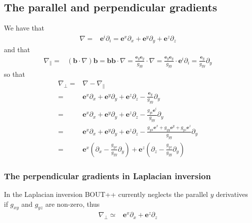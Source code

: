 \documentclass[12pt]{article}
\def\L{\left}
\def\R{\right}
\newcommand{\Grad}{\ensuremath{\nabla}}
\newcommand{\ve}[1]{\ensuremath{\boldsymbol{#1}}}
\begin{document}
\subsection{The parallel and perpendicular gradients}
%
We have that
%
\begin{align*}
    \Grad =& \ve{e}^i \partial_i = \ve{e}^x \partial_x + \ve{e}^y \partial_y +
    \ve{e}^z \partial_z
\end{align*}
%
and that
%
\begin{align*}
    \Grad_\| =& \L(\ve{b} \cdot \Grad\R) \ve{b} = \ve{b} \ve{b} \cdot \Grad =
    \frac{\ve{e}_y \ve{e}_y}{g_{yy}} \cdot \Grad = \frac{\ve{e}_y
    \ve{e}_y}{g_{yy}} \cdot \ve{e}^i \partial_i = \frac{\ve{e}_y}{g_{yy}}
    \partial_y
\end{align*}
%
so that
%
\begin{align*}
    \Grad_\perp =& \Grad - \Grad_\|\\
%
                =& \ve{e}^x \partial_x + \ve{e}^y \partial_y + \ve{e}^z
    \partial_z - \frac{\ve{e}_y}{g_{yy}} \partial_y\\
%
                =& \ve{e}^x \partial_x + \ve{e}^y \partial_y + \ve{e}^z
    \partial_z - \frac{g_{yi}\ve{e}^i}{g_{yy}} \partial_y\\
%
                =& \ve{e}^x \partial_x + \ve{e}^y \partial_y + \ve{e}^z
    \partial_z - \frac{g_{yx}\ve{e}^x +g_{yy}\ve{e}^y +g_{yz}\ve{e}^z
    }{g_{yy}}\partial_y\\
%
                =& \ve{e}^x \L(\partial_x - \frac{g_{yx}}{g_{yy}}\partial_y\R)
    +  \ve{e}^z \L(\partial_z - \frac{g_{yz}}{g_{yy}}\partial_y\R)
\end{align*}
%


\subsubsection{The perpendicular gradients in Laplacian inversion}
%
In the Laplacian inversion BOUT++ currently neglects the parallel $y$
derivatives if $g_{xy}$ and $g_{yz}$ are non-zero, thus
%
\begin{align}
    \Grad_\perp \simeq& \ve{e}^x \partial_x +  \ve{e}^z \partial_z
    \label{eq:reduced_grad_perp}
\end{align}
%
\end{document}
